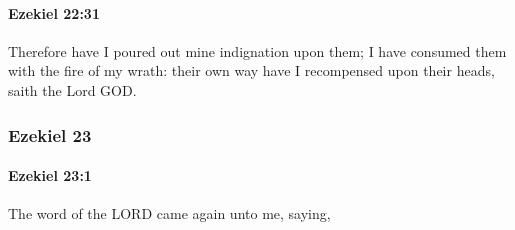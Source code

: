 		\paragraph{Ezekiel 22:31} %
			\label{EZEKIEL-22-31}

			Therefore have I poured out mine indignation upon them; I have consumed them with the fire of my wrath: their own way have I recompensed upon their heads, saith the Lord GOD.

	\subsubsection{Ezekiel 23} %
		\label{EZEKIEL-23}

		\paragraph{Ezekiel 23:1} %
			\label{EZEKIEL-23-1}

			The word of the LORD came again unto me, saying,

